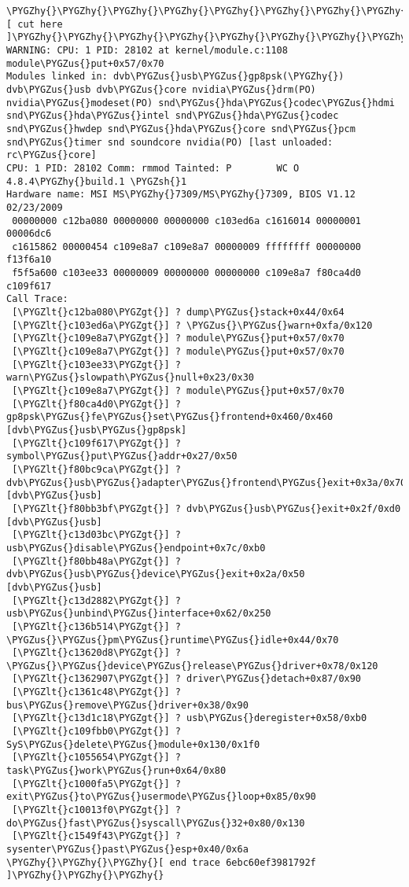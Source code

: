 \documentclass[a4paper,8pt,english]{sphinxmanual}
\def\PYGZus{\char`\_}
\def\PYGZlt{\char`\<}
\def\PYGZgt{\char`\>}
\def\PYGZsh{\char`\#}
\def\PYGZhy{\char`\-}
\begin{document}
\begin{Verbatim}[commandchars=\\\{\}]
\PYGZhy{}\PYGZhy{}\PYGZhy{}\PYGZhy{}\PYGZhy{}\PYGZhy{}\PYGZhy{}\PYGZhy{}\PYGZhy{}\PYGZhy{}\PYGZhy{}\PYGZhy{}[ cut here ]\PYGZhy{}\PYGZhy{}\PYGZhy{}\PYGZhy{}\PYGZhy{}\PYGZhy{}\PYGZhy{}\PYGZhy{}\PYGZhy{}\PYGZhy{}\PYGZhy{}\PYGZhy{}
WARNING: CPU: 1 PID: 28102 at kernel/module.c:1108 module\PYGZus{}put+0x57/0x70
Modules linked in: dvb\PYGZus{}usb\PYGZus{}gp8psk(\PYGZhy{}) dvb\PYGZus{}usb dvb\PYGZus{}core nvidia\PYGZus{}drm(PO) nvidia\PYGZus{}modeset(PO) snd\PYGZus{}hda\PYGZus{}codec\PYGZus{}hdmi snd\PYGZus{}hda\PYGZus{}intel snd\PYGZus{}hda\PYGZus{}codec snd\PYGZus{}hwdep snd\PYGZus{}hda\PYGZus{}core snd\PYGZus{}pcm snd\PYGZus{}timer snd soundcore nvidia(PO) [last unloaded: rc\PYGZus{}core]
CPU: 1 PID: 28102 Comm: rmmod Tainted: P        WC O 4.8.4\PYGZhy{}build.1 \PYGZsh{}1
Hardware name: MSI MS\PYGZhy{}7309/MS\PYGZhy{}7309, BIOS V1.12 02/23/2009
 00000000 c12ba080 00000000 00000000 c103ed6a c1616014 00000001 00006dc6
 c1615862 00000454 c109e8a7 c109e8a7 00000009 ffffffff 00000000 f13f6a10
 f5f5a600 c103ee33 00000009 00000000 00000000 c109e8a7 f80ca4d0 c109f617
Call Trace:
 [\PYGZlt{}c12ba080\PYGZgt{}] ? dump\PYGZus{}stack+0x44/0x64
 [\PYGZlt{}c103ed6a\PYGZgt{}] ? \PYGZus{}\PYGZus{}warn+0xfa/0x120
 [\PYGZlt{}c109e8a7\PYGZgt{}] ? module\PYGZus{}put+0x57/0x70
 [\PYGZlt{}c109e8a7\PYGZgt{}] ? module\PYGZus{}put+0x57/0x70
 [\PYGZlt{}c103ee33\PYGZgt{}] ? warn\PYGZus{}slowpath\PYGZus{}null+0x23/0x30
 [\PYGZlt{}c109e8a7\PYGZgt{}] ? module\PYGZus{}put+0x57/0x70
 [\PYGZlt{}f80ca4d0\PYGZgt{}] ? gp8psk\PYGZus{}fe\PYGZus{}set\PYGZus{}frontend+0x460/0x460 [dvb\PYGZus{}usb\PYGZus{}gp8psk]
 [\PYGZlt{}c109f617\PYGZgt{}] ? symbol\PYGZus{}put\PYGZus{}addr+0x27/0x50
 [\PYGZlt{}f80bc9ca\PYGZgt{}] ? dvb\PYGZus{}usb\PYGZus{}adapter\PYGZus{}frontend\PYGZus{}exit+0x3a/0x70 [dvb\PYGZus{}usb]
 [\PYGZlt{}f80bb3bf\PYGZgt{}] ? dvb\PYGZus{}usb\PYGZus{}exit+0x2f/0xd0 [dvb\PYGZus{}usb]
 [\PYGZlt{}c13d03bc\PYGZgt{}] ? usb\PYGZus{}disable\PYGZus{}endpoint+0x7c/0xb0
 [\PYGZlt{}f80bb48a\PYGZgt{}] ? dvb\PYGZus{}usb\PYGZus{}device\PYGZus{}exit+0x2a/0x50 [dvb\PYGZus{}usb]
 [\PYGZlt{}c13d2882\PYGZgt{}] ? usb\PYGZus{}unbind\PYGZus{}interface+0x62/0x250
 [\PYGZlt{}c136b514\PYGZgt{}] ? \PYGZus{}\PYGZus{}pm\PYGZus{}runtime\PYGZus{}idle+0x44/0x70
 [\PYGZlt{}c13620d8\PYGZgt{}] ? \PYGZus{}\PYGZus{}device\PYGZus{}release\PYGZus{}driver+0x78/0x120
 [\PYGZlt{}c1362907\PYGZgt{}] ? driver\PYGZus{}detach+0x87/0x90
 [\PYGZlt{}c1361c48\PYGZgt{}] ? bus\PYGZus{}remove\PYGZus{}driver+0x38/0x90
 [\PYGZlt{}c13d1c18\PYGZgt{}] ? usb\PYGZus{}deregister+0x58/0xb0
 [\PYGZlt{}c109fbb0\PYGZgt{}] ? SyS\PYGZus{}delete\PYGZus{}module+0x130/0x1f0
 [\PYGZlt{}c1055654\PYGZgt{}] ? task\PYGZus{}work\PYGZus{}run+0x64/0x80
 [\PYGZlt{}c1000fa5\PYGZgt{}] ? exit\PYGZus{}to\PYGZus{}usermode\PYGZus{}loop+0x85/0x90
 [\PYGZlt{}c10013f0\PYGZgt{}] ? do\PYGZus{}fast\PYGZus{}syscall\PYGZus{}32+0x80/0x130
 [\PYGZlt{}c1549f43\PYGZgt{}] ? sysenter\PYGZus{}past\PYGZus{}esp+0x40/0x6a
\PYGZhy{}\PYGZhy{}\PYGZhy{}[ end trace 6ebc60ef3981792f ]\PYGZhy{}\PYGZhy{}\PYGZhy{}
\end{Verbatim}
\end{document}
